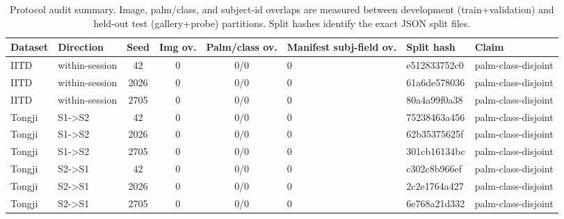 \begin{table}[t]
\centering
\caption{Protocol audit summary. Image, palm/class, and subject-id overlaps are measured between development (train+validation) and held-out test (gallery+probe) partitions. Split hashes identify the exact JSON split files.}
\label{tab:protocol_audit}
\footnotesize
\setlength{\tabcolsep}{3pt}
\begin{tabular}{llccclll}
\toprule
Dataset & Direction & Seed & Img ov. & Palm/class ov. & Manifest subj-field ov. & Split hash & Claim \\
\midrule
IITD & within-session & 42 & 0 & 0/0 & 0 & e512833752c0 & palm-class-disjoint \\
IITD & within-session & 2026 & 0 & 0/0 & 0 & 61a6de578036 & palm-class-disjoint \\
IITD & within-session & 2705 & 0 & 0/0 & 0 & 80a4a99f0a38 & palm-class-disjoint \\
Tongji & S1->S2 & 42 & 0 & 0/0 & 0 & 75238463a456 & palm-class-disjoint \\
Tongji & S1->S2 & 2026 & 0 & 0/0 & 0 & 62b35375625f & palm-class-disjoint \\
Tongji & S1->S2 & 2705 & 0 & 0/0 & 0 & 301cb16134bc & palm-class-disjoint \\
Tongji & S2->S1 & 42 & 0 & 0/0 & 0 & c302c8b966ef & palm-class-disjoint \\
Tongji & S2->S1 & 2026 & 0 & 0/0 & 0 & 2c2e1764a427 & palm-class-disjoint \\
Tongji & S2->S1 & 2705 & 0 & 0/0 & 0 & 6e768a21d332 & palm-class-disjoint \\
\bottomrule
\end{tabular}
\end{table}
